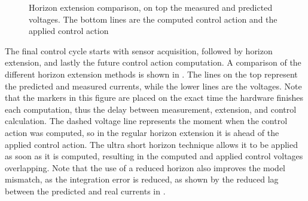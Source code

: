 \documentclass[9pt,conference]{IEEEtran}
\begin{document}
\begin{figure}[!htb]
	\centering
	\begin{subfigmatrix}{1}
	\end{subfigmatrix}
	\begin{subfigmatrix}{1}
	\end{subfigmatrix}
	\caption{Horizon extension comparison, on top the measured and predicted voltages. The bottom lines are the computed control action and the applied control action}
	\label{fig:hor_comparison}
\end{figure}

The final control cycle starts with sensor acquisition, followed by horizon extension, and lastly the future control action computation.
A comparison of the different horizon extension methods is shown in . The lines on the top represent the predicted and measured currents, while the lower lines are the voltages. Note that the markers in this figure are placed on the exact time the hardware finishes each computation, thus the delay between measurement, extension, and control calculation. The dashed voltage line represents the moment when the control action was computed, so in the regular horizon extension it is ahead of the applied control action. The ultra short horizon technique allows it to be applied as soon as it is computed, resulting in the computed and applied control voltages overlapping. Note that the use of a reduced horizon also improves the model mismatch, as the integration error is reduced, as shown by the reduced lag between the predicted and real currents in . 
\end{document}
